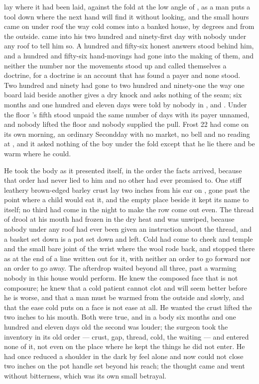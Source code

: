 
 lay where it had been laid, against the fold at the low angle of , as a man puts a tool down where the next hand will find it without looking, and the small hours came on under  roof the way cold comes into a banked house, by degrees and from the outside.  came into his two hundred and ninety-first day with nobody under any roof to tell him so. A hundred and fifty-six honest answers stood behind him, and a hundred and fifty-six hand-movings had gone into the making of them, and neither the number nor the movements stood up and called themselves a doctrine, for a doctrine is an account that has found a payer and none stood. Two hundred and ninety had gone to two hundred and ninety-one the way one board laid beside another gives a dry knock and asks nothing of the seam; six months and one hundred and eleven days were told by nobody in ,  and . Under the floor 's fifth stood unpaid the same number of days with its payer unnamed, and nobody lifted the floor and nobody supplied the pull. Frost 22 had come on its own morning, an ordinary Secondday with no market, no bell and no reading at , and it asked nothing of the boy under the fold except that he lie there and be warm where he could.

He took the body as it presented itself, in the order the facts arrived, because that order had never lied to him and no other had ever promised to. One stiff leathery brown-edged barley crust lay two inches from his ear on , gone past the point where a child would eat it, and the empty place beside it kept its name to itself; no third had come in the night to make the row come out even. The thread of drool at his mouth had frozen in the dry heat and was unwiped, because nobody under any roof had ever been given an instruction about the thread, and a basket set down is a pot set down and left. Cold had come to cheek and temple and the small bare joint of the wrist where the wool rode back, and stopped there as at the end of a line written out for it, with neither an order to go forward nor an order to go away. The afterdrop waited beyond all three, past a warming nobody in this house would perform. He knew the composed face that is not composure; he knew that a cold patient cannot clot and will seem better before he is worse, and that a man must be warmed from the outside and slowly, and that the ease cold puts on a face is not ease at all. He wanted the crust lifted the two inches to his mouth. Both were true, and in a body six months and one hundred and eleven days old the second was louder; the surgeon took the inventory in its old order --- crust, gap, thread, cold, the waiting --- and entered none of it, not even on the place where he kept the things he did not enter. He had once reduced a shoulder in the dark by feel alone and now could not close two inches on the pot handle set beyond his reach; the thought came and went without bitterness, which was its own small betrayal.

